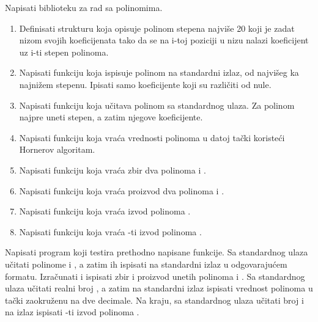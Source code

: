 \begin{Exercise}[label=1_03] %
Napisati biblioteku za rad sa polinomima.
  \begin{enumerate}
  \item Definisati strukturu  koja opisuje polinom stepena najviše 20 koji je zadat nizom svojih koeficijenata tako da se na i-toj poziciji u nizu nalazi koeficijent uz i-ti stepen polinoma.
  \item Napisati funkciju  koja ispisuje polinom  na standardni izlaz, od najvišeg ka najnižem stepenu. Ipisati samo koeficijente koji su različiti od nule.
  \item Napisati funkciju  koja učitava polinom sa standardnog
    ulaza. Za polinom najpre uneti stepen, a zatim njegove koeficijente.
  \item Napisati funkciju  koja vraća vrednosti polinoma  u
    datoj tački  koristeći Hornerov algoritam.
  \item Napisati funkciju  koja vraća zbir dva polinoma  i .
  \item Napisati funkciju  koja vraća proizvod dva polinoma  i .
  \item Napisati funkciju  koja vraća izvod polinoma .
  \item Napisati funkciju  koja vraća -ti izvod polinoma .
  \end{enumerate}

Napisati program koji testira prethodno napisane funkcije. Sa standardnog ulaza učitati polinome  i , a zatim ih ispisati na standardni izlaz u odgovarajućem formatu. Izračunati i ispisati zbir  i proizvod  unetih polinoma  i . Sa standardnog ulaza učitati realni broj , a zatim na standardni izlaz ispisati vrednost polinoma  u tački  zaokruženu na dve decimale. Na kraju, sa standardnog ulaza učitati broj  i na izlaz ispisati -ti izvod polinoma .


\end{Exercise}
